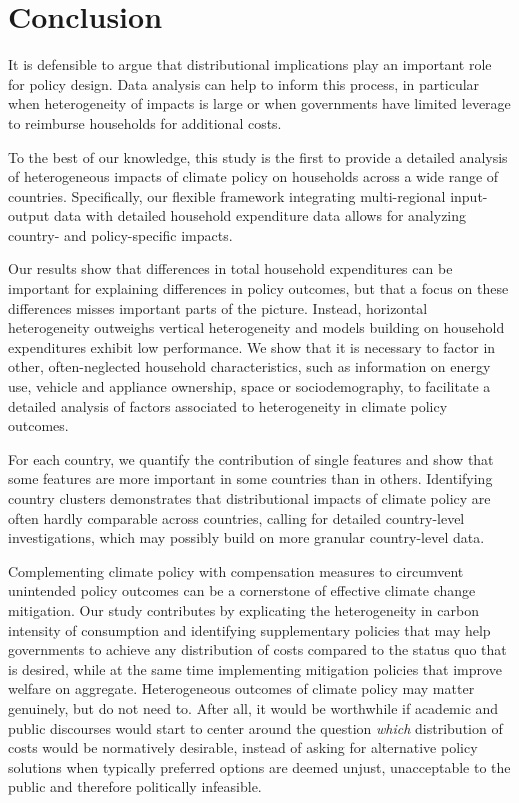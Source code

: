 \documentclass[12pt, a4paper]{article}
\begin{document}
\section{Conclusion} \label{sec:conclusion}
It is defensible to argue that distributional implications play an important role for policy design. Data analysis can help to inform this process, in particular when heterogeneity of impacts is large or when governments have limited leverage to reimburse households for additional costs.

To the best of our knowledge, this study is the first to provide a detailed analysis of heterogeneous impacts of climate policy on households across a wide range of countries. Specifically, our flexible framework integrating multi-regional input-output data with detailed household expenditure data allows for analyzing country- and policy-specific impacts.

Our results show that differences in total household expenditures can be important for explaining differences in policy outcomes, but that a focus on these differences misses important parts of the picture. Instead, horizontal heterogeneity outweighs vertical heterogeneity and models building on household expenditures exhibit low performance. We show that it is necessary to factor in other, often-neglected household characteristics, such as information on energy use, vehicle and appliance ownership, space or sociodemography, to facilitate a detailed analysis of factors associated to heterogeneity in climate policy outcomes.

For each country, we quantify the contribution of single features and show that some features are more important in some countries than in others. Identifying country clusters demonstrates that distributional impacts of climate policy are often hardly comparable across countries, calling for detailed country-level investigations, which may possibly build on more granular country-level data.

Complementing climate policy with compensation measures to circumvent unintended policy outcomes can be a cornerstone of effective climate change mitigation. Our study contributes by explicating the heterogeneity in carbon intensity of consumption and identifying supplementary policies that may help governments to achieve any distribution of costs compared to the status quo that is desired, while at the same time implementing mitigation policies that improve welfare on aggregate. Heterogeneous outcomes of climate policy may matter genuinely, but do not need to. After all, it would be worthwhile if academic and public discourses would start to center around the question \textit{which} distribution of costs would be normatively desirable, instead of asking for alternative policy solutions when typically preferred options are deemed unjust, unacceptable to the public and therefore politically infeasible. 
\end{document}
